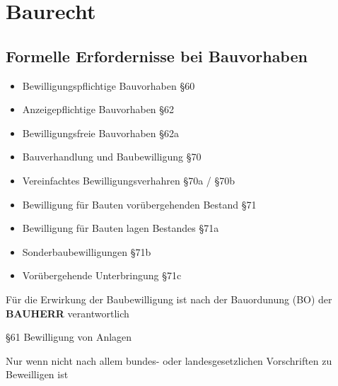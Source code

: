 \section{Baurecht}

\subsection{Formelle Erfordernisse bei Bauvorhaben}

\begin{tcolorbox}[colback=lightgray!5!lightgray,colframe=lightgray!75!black,title=Bewilligung]
	\begin{itemize}
		\item Bewilligungspflichtige Bauvorhaben §60
		\item Anzeigepflichtige Bauvorhaben §62
		\item Bewilligungsfreie Bauvorhaben §62a
	\end{itemize}
\end{tcolorbox}

\begin{tcolorbox}[colback=lightgray!5!lightgray,colframe=lightgray!75!black,title=\textbf{Bewilligungsverfahren}]
	\begin{itemize}
		\item Bauverhandlung und Baubewilligung §70
		\item Vereinfachtes Bewilligungsverhahren §70a / §70b
		\item Bewilligung für Bauten vorübergehenden Bestand §71
		\item Bewilligung für Bauten lagen Bestandes §71a
		\item Sonderbaubewilligungen §71b
		\item Vorübergehende Unterbringung §71c
	\end{itemize}
\end{tcolorbox}
\begin{tcolorbox}[colback=lightgray!5!lightgray,colframe=lightgray!75!black]
Für die Erwirkung der Baubewilligung ist nach der Bauordunung (BO) der \textbf{BAUHERR} verantwortlich
\end{tcolorbox}

§61 Bewilligung von Anlagen
\begin{tcolorbox}[colback=lightgray!5!lightgray,colframe=lightgray!75!black]
Nur wenn nicht nach allem bundes- oder landesgesetzlichen Vorschriften zu Beweilligen ist
\end{tcolorbox}

